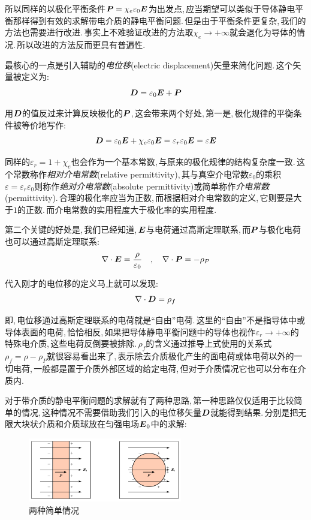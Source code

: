 所以同样的以极化平衡条件$\boldsymbol{P}=\chi_e \varepsilon_0 \boldsymbol{E}$为出发点,\,应当期望可以类似于导体静电平衡那样得到有效的求解带电介质的静电平衡问题.\,但是由于平衡条件更复杂,\,我们的方法也需要进行改进.\,事实上不难验证改进的方法取$\chi_e\to+ \infty$就会退化为导体的情况.\,所以改进的方法反而更具有普遍性.

最核心的一点是引入辅助的\emph{电位移}(electric displacement)矢量来简化问题.\,这个矢量被定义为:
\[\boldsymbol{D}=\varepsilon_0 \boldsymbol{E}+\boldsymbol{P}\]

用$\boldsymbol{D}$的值反过来计算反映极化的$\boldsymbol{P}$,\,这会带来两个好处,\,第一是,\,极化规律的平衡条件被等价地写作:
\[\boldsymbol{D}=\varepsilon_0 \boldsymbol{E}+\chi_e \varepsilon_0 \boldsymbol{E}=\varepsilon_r \varepsilon_0 \boldsymbol{E}=\varepsilon \boldsymbol{E}\]

同样的$\varepsilon_r=1+\chi_e$也会作为一个基本常数,\,与原来的极化规律的结构复杂度一致.\,这个常数称作\emph{相对介电常数}(relative permittivity),\,其与真空介电常数$\varepsilon_0$的乘积$\varepsilon=\varepsilon_r \varepsilon_0$则称作\emph{绝对介电常数}(absolute permittivity)或简单称作\emph{介电常数}(permittivity).\,合理的极化率应当为正数,\,而根据相对介电常数的定义,\,它则要是大于$1$的正数.\,而介电常数的实用程度大于极化率的实用程度.

第二个关键的好处是,\,我们已经知道,\,$\boldsymbol{E}$与电荷通过高斯定理联系,\,而$\boldsymbol{P}$与极化电荷也可以通过高斯定理联系:
\[\nabla\cdot \boldsymbol{E}=\frac{\rho}{\varepsilon_0}\quad ,\quad \nabla\cdot \boldsymbol{P}=-\rho_P\]

代入刚才的电位移的定义马上就可以发现:
\[\nabla \cdot \boldsymbol{D}=\rho_f\]

即,\,电位移通过高斯定理联系的电荷就是``自由''电荷.\,这里的``自由''不是指导体中或导体表面的电荷,\,恰恰相反,\,如果把导体静电平衡问题中的导体也视作$\varepsilon_r\to+ \infty$的特殊电介质,\,这些电荷反倒要被排除.\,$\rho_f$的含义通过推导上式使用的关系式$\rho_f=\rho-\rho_P$就很容易看出来了,\,表示除去介质极化产生的面电荷或体电荷以外的一切电荷,\,一般都是置于介质外部区域的给定电荷,\,但对于介质情况它也可以分布在介质内.

对于带介质的静电平衡问题的求解就有了两种思路,\,第一种思路仅仅适用于比较简单的情况,\,这种情况不需要借助我们引入的电位移矢量$\boldsymbol{D}$就能得到结果.\,分别是把无限大块状介质和介质球放在匀强电场$\boldsymbol{E}_0$中的求解:

\begin{figure}[H]
\centering
\includegraphics[width=0.6\textwidth]{image/7-2-12.png}
\caption{两种简单情况}
\end{figure}

